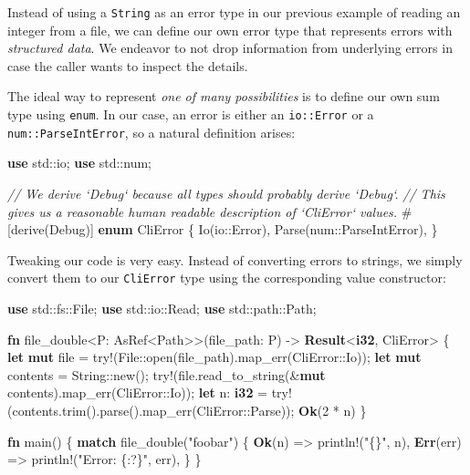 \documentclass[a4paper,]{book}
\newenvironment{Shaded}{\begin{snugshade}}{\end{snugshade}}
\newcommand{\KeywordTok}[1]{\textcolor[rgb]{0.13,0.29,0.53}{\textbf{{#1}}}}
\newcommand{\DecValTok}[1]{\textcolor[rgb]{0.00,0.00,0.81}{{#1}}}
\newcommand{\StringTok}[1]{\textcolor[rgb]{0.31,0.60,0.02}{{#1}}}
\newcommand{\CommentTok}[1]{\textcolor[rgb]{0.56,0.35,0.01}{\textit{{#1}}}}
\newcommand{\OtherTok}[1]{\textcolor[rgb]{0.56,0.35,0.01}{{#1}}}
\newcommand{\NormalTok}[1]{{#1}}
\begin{document}
Instead of using a \texttt{String} as an error type in our previous
example of reading an integer from a file, we can define our own error
type that represents errors with \emph{structured data}. We endeavor to
not drop information from underlying errors in case the caller wants to
inspect the details.

The ideal way to represent \emph{one of many possibilities} is to define
our own sum type using \texttt{enum}. In our case, an error is either an
\texttt{io::Error} or a \texttt{num::ParseIntError}, so a natural
definition arises:

\begin{Shaded}
\begin{Highlighting}[]
\KeywordTok{use} \NormalTok{std::io;}
\KeywordTok{use} \NormalTok{std::num;}

\CommentTok{// We derive `Debug` because all types should probably derive `Debug`.}
\CommentTok{// This gives us a reasonable human readable description of `CliError` values.}
\OtherTok{#[}\NormalTok{derive}\OtherTok{(}\NormalTok{Debug}\OtherTok{)]}
\KeywordTok{enum} \NormalTok{CliError \{}
    \NormalTok{Io(io::Error),}
    \NormalTok{Parse(num::ParseIntError),}
\NormalTok{\}}
\end{Highlighting}
\end{Shaded}

Tweaking our code is very easy. Instead of converting errors to strings,
we simply convert them to our \texttt{CliError} type using the
corresponding value constructor:

\begin{Shaded}
\begin{Highlighting}[]
\KeywordTok{use} \NormalTok{std::fs::File;}
\KeywordTok{use} \NormalTok{std::io::Read;}
\KeywordTok{use} \NormalTok{std::path::Path;}

\KeywordTok{fn} \NormalTok{file_double<P: AsRef<Path>>(file_path: P) -> }\KeywordTok{Result}\NormalTok{<}\KeywordTok{i32}\NormalTok{, CliError> \{}
    \KeywordTok{let} \KeywordTok{mut} \NormalTok{file = }\OtherTok{try!}\NormalTok{(File::open(file_path).map_err(CliError::Io));}
    \KeywordTok{let} \KeywordTok{mut} \NormalTok{contents = String::new();}
    \OtherTok{try!}\NormalTok{(file.read_to_string(&}\KeywordTok{mut} \NormalTok{contents).map_err(CliError::Io));}
    \KeywordTok{let} \NormalTok{n: }\KeywordTok{i32} \NormalTok{= }\OtherTok{try!}\NormalTok{(contents.trim().parse().map_err(CliError::Parse));}
    \KeywordTok{Ok}\NormalTok{(}\DecValTok{2} \NormalTok{* n)}
\NormalTok{\}}

\KeywordTok{fn} \NormalTok{main() \{}
    \KeywordTok{match} \NormalTok{file_double(}\StringTok{"foobar"}\NormalTok{) \{}
        \KeywordTok{Ok}\NormalTok{(n) => }\OtherTok{println!}\NormalTok{(}\StringTok{"\{\}"}\NormalTok{, n),}
        \KeywordTok{Err}\NormalTok{(err) => }\OtherTok{println!}\NormalTok{(}\StringTok{"Error: \{:?\}"}\NormalTok{, err),}
    \NormalTok{\}}
\NormalTok{\}}
\end{Highlighting}
\end{Shaded}
\end{document}
